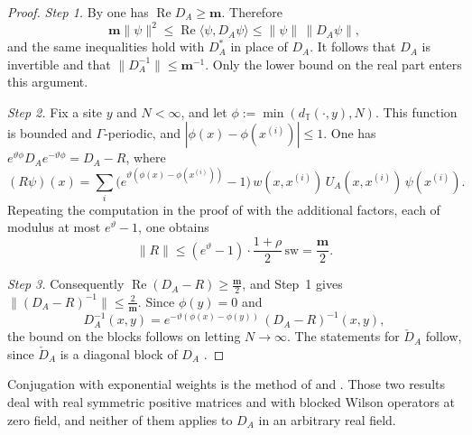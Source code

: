 \documentclass[11pt,letterpaper,reqno]{amsart}
\theoremstyle{definition}
\begin{document}
\begin{proof}
\emph{Step 1.}
By \cite[Proposition~3.18\,(b)]{QEDII} one has $\operatorname{Re}D_A\ge\mathbf m$.
Therefore
\begin{equation*}
\mathbf m\|\psi\|^2\le\operatorname{Re}\langle\psi,D_A\psi\rangle\le\|\psi\|\,\|D_A\psi\|,
\end{equation*}
and the same inequalities hold with $D_A^*$ in place of $D_A$.
It follows that $D_A$ is invertible and that $\|D_A^{-1}\|\le\mathbf m^{-1}$.
Only the lower bound on the real part enters this argument.

\emph{Step 2.}
Fix a site $y$ and $N<\infty$, and let $\phi:=\min(d_{\mathbb T}(\cdot,y),N)$.
This function is bounded and $\Gamma$-periodic, and $|\phi(x)-\phi(x^{(i)})|\le1$.
One has $e^{\vartheta\phi}D_Ae^{-\vartheta\phi}=D_A-R$, where
\begin{equation*}
(R\psi)(x)=\sum_i\bigl(e^{\vartheta(\phi(x)-\phi(x^{(i)}))}-1\bigr)\,w(x,x^{(i)})\,U_A(x,x^{(i)})\,\psi(x^{(i)}).
\end{equation*}
Repeating the computation in the proof of \cite[Proposition~3.18\,(c)]{QEDII} with the additional factors, each of modulus at most $e^{\vartheta}-1$, one obtains
\begin{equation*}
\|R\|\le(e^{\vartheta}-1)\cdot\frac{1+\rho}{2}\,\mathrm{sw}=\frac{\mathbf m}{2}.
\end{equation*}

\emph{Step 3.}
Consequently $\operatorname{Re}(D_A-R)\ge\frac{\mathbf m}{2}$, and Step~1 gives $\|(D_A-R)^{-1}\|\le\frac{2}{\mathbf m}$.
Since $\phi(y)=0$ and
\begin{equation*}
D_A^{-1}(x,y)=e^{-\vartheta(\phi(x)-\phi(y))}\,(D_A-R)^{-1}(x,y),
\end{equation*}
the bound on the blocks follows on letting $N\to\infty$.
The statements for $\check D_A$ follow, since $\check D_A$ is a diagonal block of $D_A$ \cite[Proposition~3.18\,(d)]{QEDII}.
\end{proof}

Conjugation with exponential weights is the method of \cite[Lemma~15.23]{QEDI} and \cite[Theorem~12.15]{QEDI}.
Those two results deal with real symmetric positive matrices and with blocked Wilson operators at zero field, and neither of them applies to $D_A$ in an arbitrary real field.
\end{document}
